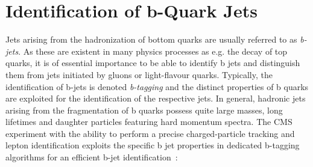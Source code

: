 \section{Identification of b-Quark Jets}
\label{sec:btagging}
Jets arising from the hadronization of bottom quarks are usually referred to as \textit{b-jets}. As these are existent in many physics processes as e.g. the decay of top quarks, it is of essential importance to be able to identify b jets and distinguish them from jets initiated by gluons or light-flavour quarks. Typically, the identification of b-jets is denoted \textit{b-tagging} and the distinct properties of b quarks are exploited for the identification of the respective jets. In general, hadronic jets arising from the fragmentation of b quarks possess quite large masses, long lifetimes and daughter particles featuring hard momentum spectra. The CMS experiment with the ability to perform a precise charged-particle tracking and lepton identification exploits the specific b jet properties in dedicated b-tagging algorithms for an efficient b-jet identification~\cite{Chatrchyan:2012jua}:
